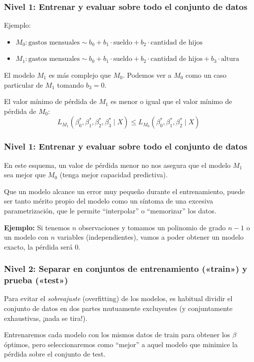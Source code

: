 \documentclass[aspectratio=169,12pt]{beamer}
\begin{document}

\begin{frame}
\frametitle{Nivel 1: Entrenar y evaluar sobre todo el conjunto de datos}

Ejemplo:
\begin{itemize}
\item $M_0: \text{gastos mensuales} \sim b_0 + b_1 \cdot \text{sueldo} + b_2 \cdot \text{cantidad de hijos}$
\item $M_1: \text{gastos mensuales} \sim b_0 + b_1 \cdot \text{sueldo} + b_2 \cdot \text{cantidad de hijos} + b_3 \cdot \text{altura}$
\end{itemize}

El modelo $M_1$ es m\'as complejo que $M_0$. Podemos ver a $M_0$ como un caso particular de $M_1$ tomando $b_3 = 0$.

El valor mínimo de pérdida de $M_1$ es menor o igual que el valor mínimo de pérdida de $M_0$:
$$
L_{M_1}(\beta_0^*,\beta_1^*,\beta_2^*,\beta_3^* \mid X) \le L_{M_0}(\beta_0^*,\beta_1^*,\beta_2^* \mid X)
$$

\end{frame}



\begin{frame}
\frametitle{Nivel 1: Entrenar y evaluar sobre todo el conjunto de datos}

En este esquema, un valor de pérdida menor no nos asegura que el modelo $M_1$ sea mejor que $M_0$ (tenga mejor capacidad predictiva).

Que un modelo alcance un error muy pequeño durante el entrenamiento, puede ser tanto mérito propio del modelo como un síntoma de una excesiva parametrización, que le permite ``interpolar'' o ``memorizar'' los datos.

\textbf{Ejemplo:} Si tenemos $n$ observaciones y tomamos un polinomio de grado $n-1$ o un modelo con $n$ variables (independientes), vamos a poder obtener un modelo exacto, la pérdida será 0.

\end{frame}


\begin{frame}
\frametitle{Nivel 2: Separar en conjuntos de entrenamiento («train») y prueba («test»)}

Para evitar el \emph{sobreajuste} (overfitting) de los modelos, es habitual dividir el conjunto
de datos en dos partes mutuamente excluyentes (y conjuntamente exhaustivas, ¡nada
se tira!).

Entrenaremos cada modelo con los mismos datos de train para obtener los $\beta$
óptimos, pero seleccionaremos como ``mejor'' a aquel modelo que minimice la pérdida  sobre el conjunto de test.


\end{frame}
\end{document}
